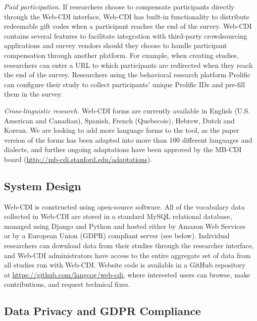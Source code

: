 \documentclass[
  english,
  ,man,floatsintext]{apa6}
\begin{document}
\emph{Paid participation.} If researchers choose to compensate participants directly through the Web-CDI interface, Web-CDI has built-in functionality to distribute redeemable gift codes when a participant reaches the end of the survey. Web-CDI contains several features to facilitate integration with third-party crowdsourcing applications and survey vendors should they choose to handle participant compensation through another platform. For example, when creating studies, researchers can enter a URL to which participants are redirected when they reach the end of the survey. Researchers using the behavioral research platform Prolific can configure their study to collect participants' unique Prolific IDs and pre-fill them in the survey.

\emph{Cross-linguistic research.} Web-CDI forms are currently available in English (U.S. American and Canadian), Spanish, French (Quebecois), Hebrew, Dutch and Korean. We are looking to add more language forms to the tool, as the paper version of the forms has been adapted into more than 100 different languages and dialects, and further ongoing adaptations have been approved by the MB-CDI board (\url{http://mb-cdi.stanford.edu/adaptations}).

\hypertarget{system-design}{%
\subsection{System Design}\label{system-design}}

Web-CDI is constructed using open-source software. All of the vocabulary data collected in Web-CDI are stored in a standard MySQL relational database, managed using Django and Python and hosted either by Amazon Web Services or by a European Union (GDPR) compliant server (see below). Individual researchers can download data from their studies through the researcher interface, and Web-CDI administrators have access to the entire aggregate set of data from all studies run with Web-CDI. Website code is available in a GitHub repository at \url{https://github.com/langcog/web-cdi}, where interested users can browse, make contributions, and request technical fixes.

\hypertarget{data-privacy-and-gdpr-compliance}{%
\subsection{Data Privacy and GDPR Compliance}\label{data-privacy-and-gdpr-compliance}}
\end{document}

